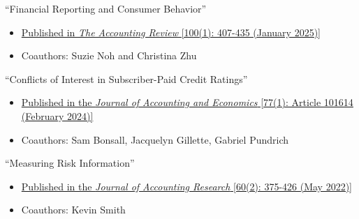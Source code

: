 


\pagebreak[0]
\begin{samepage}
\item  ``Financial Reporting and Consumer Behavior''
\begin{itemize}
\vspace*{-.07in}
	\item \href{https://doi.org/10.2308/TAR-2023-0293}{Published in {\it The Accounting Review} [100(1): 407-435 (January 2025)]}
	\vspace*{-.07in}
	\item Coauthors: Suzie Noh and Christina Zhu

\end{itemize}
\end{samepage}
\vskip 0.08cm

\item  ``Conflicts of Interest in Subscriber-Paid
 Credit Ratings''
\begin{itemize}
\vspace*{-.07in}
	\item \href{https://doi.org/10.1016/j.jacceco.2023.101614}{Published in the {\it Journal of Accounting and Economics} [77(1): Article 101614 (February 2024)]}
	\vspace*{-.07in}
	\item Coauthors: Sam Bonsall, Jacquelyn Gillette, Gabriel Pundrich

\end{itemize}
\vskip 0.08cm

\pagebreak[0]
\begin{samepage}
\item ``Measuring Risk Information''
\begin{itemize}
\vspace*{-.07in}
	\item \href{https://doi.org/10.1111/1475-679X.12413}{Published in the {\it Journal of Accounting Research} [60(2): 375-426 (May 2022)]}
	\vspace*{-.07in}
	\item Coauthors: Kevin Smith

\end{itemize}
\end{samepage}
\vskip 0.08cm


